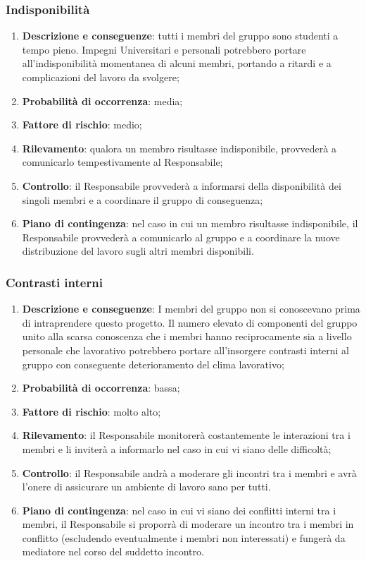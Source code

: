 	\subsubsection{Indisponibilità}
	\begin{enumerate}
		\item \textbf{Descrizione e conseguenze}: tutti i membri del gruppo sono studenti a tempo pieno. Impegni Universitari e personali potrebbero portare all'indisponibilità momentanea di alcuni membri, portando a ritardi e a complicazioni del lavoro da svolgere; 
		\item \textbf{Probabilità di occorrenza}: media;
		\item \textbf{Fattore di rischio}: medio;
		\item \textbf{Rilevamento}: qualora un membro risultasse indisponibile, provvederà a comunicarlo tempestivamente al Responsabile;
		\item \textbf{Controllo}: il Responsabile provvederà a informarsi della disponibilità dei singoli membri e a coordinare il gruppo di conseguenza;
		\item \textbf{Piano di contingenza}: nel caso in cui un membro risultasse indisponibile, il Responsabile provvederà a comunicarlo al gruppo e a coordinare la nuove distribuzione del lavoro sugli altri membri disponibili.
	\end{enumerate}
	
	\subsubsection{Contrasti interni}
	\begin{enumerate}
		\item \textbf{Descrizione e conseguenze}: I membri del gruppo non si conoscevano prima di intraprendere questo progetto. Il numero elevato di componenti del gruppo unito alla scarsa conoscenza che i membri hanno reciprocamente sia a livello personale che lavorativo potrebbero portare all'insorgere contrasti interni al gruppo con conseguente deterioramento del clima lavorativo;
		\item \textbf{Probabilità di occorrenza}: bassa;
		\item \textbf{Fattore di rischio}: molto alto;
		\item \textbf{Rilevamento}: il Responsabile monitorerà costantemente le interazioni tra i membri e li inviterà a informarlo nel caso in cui vi siano delle difficoltà;
		\item \textbf{Controllo}: il Responsabile andrà a moderare gli incontri tra i membri e avrà l'onere di assicurare un ambiente di lavoro sano per tutti. 
		\item \textbf{Piano di contingenza}: nel caso in cui vi siano dei conflitti interni tra i membri, il Responsabile si proporrà di moderare un incontro tra i membri in conflitto (escludendo eventualmente i membri non interessati) e fungerà da mediatore nel corso del suddetto incontro.
	\end{enumerate}
	
